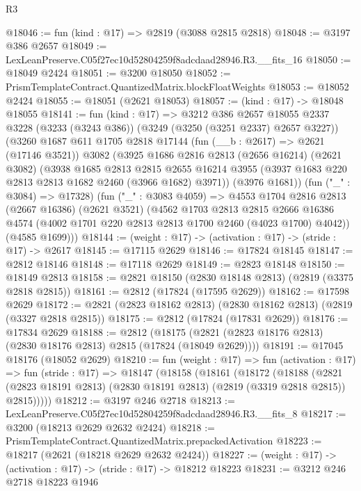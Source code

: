 \begin{lexlean}{R3}
\begin{coremodule}
@18046 := fun (kind : @17) => @2819 (@3088 @2815 @2818)
@18048 := @3197 @386 @2657
@18049 := LexLeanPreserve.C05f27ec10d52804259f8adcdaad28946.R3.__fits_16
@18050 := @18049 @2424
@18051 := @3200 @18050
@18052 := PrismTemplateContract.QuantizedMatrix.blockFloatWeights
@18053 := @18052 @2424
@18055 := @18051 (@2621 @18053)
@18057 := (kind : @17) -> @18048 @18055
@18141 := fun (kind : @17) =>
  @3212
    @386
    @2657
    @18055
    @2337
    @3228
    (@3233 (@3243 @386))
    (@3249 (@3250 (@3251 @2337) @2657 @3227))
    (@3260
      @1687
      @611
      @1705
      @2818
      @17144
      (fun (__b : @2617) => @2621 (@17146 @3521))
      @3082
      (@3925
        @1686
        @2816
        @2813
        (@2656 @16214)
        (@2621 @3082)
        (@3938
          @1685
          @2813
          @2815
          @2655
          @16214
          @3955
          (@3937 @1683 @220 @2813 @2813 @1682 @2460 (@3966 @1682) @3971))
        (@3976 @1681))
      (fun ("_" : @3084) => @17328)
      (fun ("_" : @3083 @4059) =>
      @4553
        @1704
        @2816
        @2813
        (@2667 @16386)
        (@2621 @3521)
        (@4562
          @1703
          @2813
          @2815
          @2666
          @16386
          @4574
          (@4002 @1701 @220 @2813 @2813 @1700 @2460 (@4023 @1700) @4042))
        (@4585 @1699)))
@18144 := (weight : @17) -> (activation : @17) -> (stride : @17) -> @2617
@18145 := @17115 @2629
@18146 := @17824 @18145
@18147 := @2812 @18146
@18148 := @17118 @2629
@18149 := @2823 @18148
@18150 := @18149 @2813
@18158 := @2821 @18150 (@2830 @18148 @2813) (@2819 (@3375 @2818 @2815))
@18161 := @2812 (@17824 (@17595 @2629))
@18162 := @17598 @2629
@18172 := @2821 (@2823 @18162 @2813) (@2830 @18162 @2813) (@2819 (@3327 @2818 @2815))
@18175 := @2812 (@17824 (@17831 @2629))
@18176 := @17834 @2629
@18188 := @2812
    (@18175 (@2821 (@2823 @18176 @2813) (@2830 @18176 @2813) @2815 (@17824 (@18049 @2629))))
@18191 := @17045 @18176 (@18052 @2629)
@18210 := fun (weight : @17) =>
  fun (activation : @17) =>
  fun (stride : @17) =>
  @18147
    (@18158
      (@18161
        (@18172
          (@18188
            (@2821 (@2823 @18191 @2813) (@2830 @18191 @2813) (@2819 (@3319 @2818 @2815)) @2815)))))
@18212 := @3197 @246 @2718
@18213 := LexLeanPreserve.C05f27ec10d52804259f8adcdaad28946.R3.__fits_8
@18217 := @3200 (@18213 @2629 @2632 @2424)
@18218 := PrismTemplateContract.QuantizedMatrix.prepackedActivation
@18223 := @18217 (@2621 (@18218 @2629 @2632 @2424))
@18227 := (weight : @17) -> (activation : @17) -> (stride : @17) -> @18212 @18223
@18231 := @3212 @246 @2718 @18223 @1946

\end{coremodule}
\end{lexlean}
